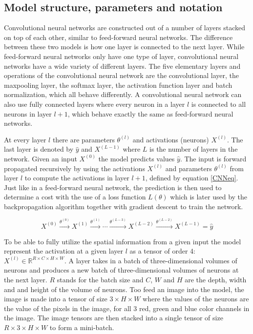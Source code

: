 \documentclass[a4paper, twoside]{article}
\begin{document}
\subsection{Model structure, parameters and notation}
Convolutional neural networks are constructed out of a number of layers stacked on top of each other, similar to feed-forward neural networks. The difference between these two models is how one layer is connected to the next layer. While feed-forward neural networks only have one type of layer, convolutional neural networks have a wide variety of different layers. The five elementary layers and operations of the convolutional neural network are the convolutional layer, the maxpooling layer, the softmax layer, the activation function layer and batch normalization, which all behave differently. A convolutional neural network can also use fully connected layers where every neuron in a layer $l$ is connected to all neurons in layer $l+1$, which behave exactly the same as feed-forward neural networks. \cite{cs231n} \cite{convmath} \cite{convarithmetic}

At every layer $l$ there are parameters $\theta^{(l)}$ and activations (neurons) $X^{(l)}$. The last layer is denoted by $\hat{y}$ and $X^{(L-1)}$ where $L$ is the number of layers in the network. Given an input $X^{(0)}$ the model predicts values $\hat{y}$. The input is forward propagated recursively by using the activations $X^{(l)}$ and parameters $\theta^{(l)}$ from layer $l$ to compute the activations in layer $l+1$, defined by equation \eqref{CNNeq}. Just like in a feed-forward neural network, the prediction is then used to determine a cost with the use of a loss function $L(\theta)$ which is later used by the backpropagation algorithm together with gradient descent to train the network. \cite{cs231n} \cite{convmath}

\begin{equation}\label{CNNeq}
X^{(0)} \xrightarrow{\theta^{(0)}} X^{(1)}  \xrightarrow{\theta^{(1)}} \cdots  \xrightarrow{\theta^{(L-3)}} X^{(L-2)}  \xrightarrow{\theta^{(L-2)}} X^{(L-1)} = \hat{y}
\end{equation}

To be able to fully utilize the spatial information from a given input the model represent the activation at a given layer $l$ as a tensor of order 4: $X^{(l)} \in \mathbb{R}^{R \times C  \times H \times W}$. A layer takes in a batch of three-dimensional volumes of neurons and produces a new batch of three-dimensional volumes of neurons at the next layer. $R$ stands for the batch size and $C$, $W$ and $H$ are the depth, width and and height of the volume of neurons. Too feed an image into the model, the image is made into a tensor of size $3 \times H \times W$ where the values of the neurons are the value of the pixels in the image, for all 3 red, green and blue color channels in the image. The image tensors are then stacked into a single tensor of size $R \times 3 \times H \times W$ to form a mini-batch. \cite{cs231n} 
\end{document}
